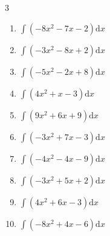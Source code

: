 \begin{multicols}{3}
\begin{enumerate}
  \item $\displaystyle \int \left( -8x^{2}-7x-2 \right) \mathrm{d}x$


\columnbreak %

\resetques

  \item $\displaystyle \int \left( -3x^{2}-8x+2 \right) \mathrm{d}x$


  \item $\displaystyle \int \left( -5x^{2}-2x+8 \right) \mathrm{d}x$


  \item $\displaystyle \int \left( 4x^{2}+x-3 \right) \mathrm{d}x$


  \item $\displaystyle \int \left( 9x^{2}+6x+9 \right) \mathrm{d}x$


  \item $\displaystyle \int \left( -3x^{2}+7x-3 \right) \mathrm{d}x$


  \item $\displaystyle \int \left( -4x^{2}-4x-9 \right) \mathrm{d}x$


  \item $\displaystyle \int \left( -3x^{2}+5x+2 \right) \mathrm{d}x$


  \item $\displaystyle \int \left( 4x^{2}+6x-3 \right) \mathrm{d}x$


  \item $\displaystyle \int \left( -8x^{2}+4x-6 \right) \mathrm{d}x$



\end{enumerate}
\end{multicols}
